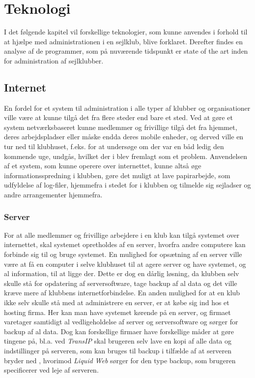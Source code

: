 \chapter{Teknologi}\label{chap:teknologi-analyse}

I det følgende kapitel vil forskellige teknologier, som kunne anvendes i forhold til at hjælpe med administrationen i en
sejlklub, blive forklaret. Derefter findes en analyse af de programmer, som på nuværende tidspunkt er state of the art
inden for administration af sejlklubber.


\section{Internet}
En fordel for et system til administration i alle typer af klubber og organisationer ville være at kunne tilgå det fra
flere steder end bare et sted. Ved at gøre et system netværksbaseret kunne medlemmer og frivillige tilgå det fra hjemmet, 
deres arbejdspladser eller måske endda deres mobile enheder, 
og derved ville en tur ned til klubhuset, f.eks. for at undersøge om der var en båd ledig den
kommende uge, undgås, hvilket der i  blev fremlagt som et problem. Anvendelsen
af et system, som kunne operere over internettet, kunne altså øge informationsspredning i klubben, gøre det muligt at lave
papirarbejde, som udfyldelse af log-filer, hjemmefra i stedet for i klubben og tilmelde sig sejladser og andre arrangementer
hjemmefra. 


\subsection*{Server}

For at alle medlemmer og frivillige arbejdere i en klub kan tilgå systemet over internettet, skal systemet opretholdes
af en server, hvorfra andre computere kan forbinde sig til og bruge systemet. En mulighed for opsætning af en server
ville være at få en computer i selve klubhuset til at agere server og have systemet, og al information, til at ligge der.
Dette er dog en dårlig løsning, da klubben selv skulle stå for opdatering af serversoftware, tage backup af al data og
det ville kræve mere af klubbens internetforbindelse. En anden mulighed for at en klub ikke selv skulle stå med at
administrere en server, er at købe sig ind hos et hosting firma. Her kan man have systemet kørende på en server, og firmaet
varetager samtidigt al vedligeholdelse af server og serversoftware og sørger for backup af al data. Dog kan forskellige
firmaer have forskellige måder at gøre tingene på, bl.a. ved \textit{TransIP} skal brugeren selv lave en kopi af alle
data og indstillinger på serveren, som kan bruges til backup i tilfælde af at serveren bryder ned \citep{Virtuelserver},
hvorimod \textit{Liquid Web} \citep{liquid} sørger for den type backup, som brugeren specificerer ved leje af serveren.

